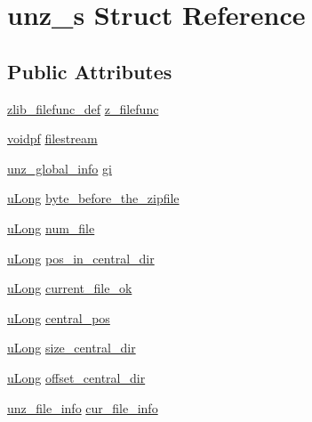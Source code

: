 \hypertarget{structunz__s}{\section{unz\-\_\-s Struct Reference}
\label{structunz__s}
}
\subsection*{Public Attributes}
\begin{DoxyCompactItemize}
\item 
\hyperlink{ioapi_8h_a269f2bded66a7ee4052a60025afebd7e}{zlib\-\_\-filefunc\-\_\-def} \hyperlink{structunz__s_a7be6cd9deaecd46f98f462bf6594baf1}{z\-\_\-filefunc}
\item 
\hyperlink{zconf_8h_aa0944432a046192e6602e13ec126acaa}{voidpf} \hyperlink{structunz__s_a40596bc73de7dacd226048d4334b5c78}{filestream}
\item 
\hyperlink{unzip_8h_a18c3b238618ea86ef503ecbd4092dbce}{unz\-\_\-global\-\_\-info} \hyperlink{structunz__s_a131303f89af11a26b53e99a58d6517cf}{gi}
\item 
\hyperlink{zconf_8h_a154b3b80120c903a368fec5f11f3007a}{u\-Long} \hyperlink{structunz__s_a788688a8021cbbba6a2ac1765edd362e}{byte\-\_\-before\-\_\-the\-\_\-zipfile}
\item 
\hyperlink{zconf_8h_a154b3b80120c903a368fec5f11f3007a}{u\-Long} \hyperlink{structunz__s_a737337b347bd5cc52bfabdcfbc11b853}{num\-\_\-file}
\item 
\hyperlink{zconf_8h_a154b3b80120c903a368fec5f11f3007a}{u\-Long} \hyperlink{structunz__s_a70f2901a7ba85573aa280bad826baf4a}{pos\-\_\-in\-\_\-central\-\_\-dir}
\item 
\hyperlink{zconf_8h_a154b3b80120c903a368fec5f11f3007a}{u\-Long} \hyperlink{structunz__s_abe2244ba62db8b3251634e26183f1c9a}{current\-\_\-file\-\_\-ok}
\item 
\hyperlink{zconf_8h_a154b3b80120c903a368fec5f11f3007a}{u\-Long} \hyperlink{structunz__s_a2d8ae4c0975d2057e30b13c3148c27eb}{central\-\_\-pos}
\item 
\hyperlink{zconf_8h_a154b3b80120c903a368fec5f11f3007a}{u\-Long} \hyperlink{structunz__s_a60b803a02e17ae46755cb94026ae973a}{size\-\_\-central\-\_\-dir}
\item 
\hyperlink{zconf_8h_a154b3b80120c903a368fec5f11f3007a}{u\-Long} \hyperlink{structunz__s_ac6c37ef70549769fa59bca623565d78f}{offset\-\_\-central\-\_\-dir}
\item 
\hyperlink{unzip_8h_a03b3ec1a8745daa96699ac49f193b177}{unz\-\_\-file\-\_\-info} \hyperlink{structunz__s_ab1963897ac959ca0f9b4208c573c2795}{cur\-\_\-file\-\_\-info}

\end{DoxyCompactItemize}
